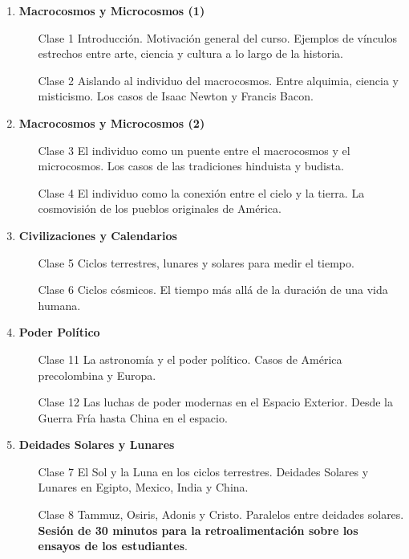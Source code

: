 \documentclass[12pt]{report}
\begin{document}
\begin{enumerate}
\item {\bf Macrocosmos y Microcosmos (1)}
\begin{itemize}
\item[Clase 1] Introducci\'on. Motivaci\'on general del
  curso. Ejemplos de v\'inculos estrechos entre arte, ciencia y cultura a lo
  largo de la historia. 
\item[Clase 2]  Aislando al individuo del macrocosmos. Entre alquimia, ciencia y
  misticismo. Los casos de Isaac Newton y Francis Bacon.  
\end{itemize}

\item {\bf Macrocosmos y Microcosmos (2)}
\begin{itemize}
\item[Clase 3] El individuo como un puente entre el macrocosmos y el
  microcosmos. Los casos de las tradiciones hinduista y budista.
\item[Clase 4] El individuo como la conexi\'on entre el cielo y la
  tierra. La cosmovisi\'on de los pueblos originales de Am\'erica.
\end{itemize}

\item {\bf Civilizaciones y Calendarios}
\begin{itemize}
\item [Clase 5] Ciclos terrestres, lunares y solares para medir el
  tiempo. 
\item [Clase 6] Ciclos c\'osmicos. El tiempo m\'as all\'a de la
  duraci\'on de una vida humana. 
\end{itemize}

\item {\bf Poder Pol\'itico}
\begin{itemize}
\item[Clase 11] La astronom\'ia y el poder pol\'itico.
Casos de Am\'erica precolombina y Europa.
\item[Clase 12] Las luchas de poder modernas en el Espacio
  Exterior. Desde la Guerra Fr\'ia hasta China en el espacio. 
\end{itemize}


\item {\bf Deidades Solares y Lunares}
  \begin{itemize}
  \item[Clase 7] El Sol y la Luna en los ciclos terrestres. Deidades
    Solares y Lunares en Egipto, Mexico, India y China.
  \item[Clase 8] Tammuz, Osiris, Adonis y Cristo. Paralelos entre
    deidades solares.
  {\bf Sesi\'on de 30 minutos para la retroalimentaci\'on sobre los
    ensayos de los estudiantes}. 
\end{itemize}


\end{enumerate}
\end{document}
